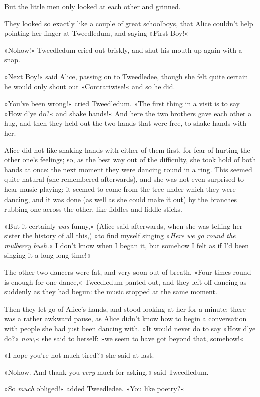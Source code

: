 But the little men only looked at each other and grinned.

They looked so exactly like a couple of great schoolboys, that Alice couldn't help pointing her finger at Tweedledum, and saying »First Boy!«

»Nohow!« Tweedledum cried out briskly, and shut his mouth up again with a snap.

»Next Boy!« said Alice, passing on to Tweedledee, though she felt quite certain he would only shout out »Contrariwise!« and so he did.

»You've been wrong!« cried Tweedledum. »The first thing in a visit is to say »How d'ye do?« and shake hands!« And here the two brothers gave each other a hug, and then they held out the two hands that were free, to shake hands with her.

Alice did not like shaking hands with either of them first, for fear of hurting the other one's feelings; so, as the best way out of the difficulty, she took hold of both hands at once: the next moment they were dancing round in a ring. This seemed quite natural (she remembered afterwards), and she was not even surprised to hear music playing: it seemed to come from the tree under which they were dancing, and it was done (as well as she could make it out) by the branches rubbing one across the other, like fiddles and fiddle-sticks.

»But it certainly \textit{was} funny,« (Alice said afterwards, when she was telling her sister the history of all this,) »to find myself singing »\textit{Here we go round the mulberry bush.}« I don't know when I began it, but somehow I felt as if I'd been singing it a long long time!«

The other two dancers were fat, and very soon out of breath. »Four times round is enough for one dance,« Tweedledum panted out, and they left off dancing as suddenly as they had begun: the music stopped at the same moment.

Then they let go of Alice's hands, and stood looking at her for a minute: there was a rather awkward pause, as Alice didn't know how to begin a conversation with people she had just been dancing with. »It would never do to say »How d'ye do?« \textit{now,}« she said to herself: »we seem to have got beyond that, somehow!«

»I hope you're not much tired?« she said at last.

»Nohow. And thank you \textit{very} much for asking,« said Tweedledum.

»So \textit{much} obliged!« added Tweedledee. »You like poetry?«

